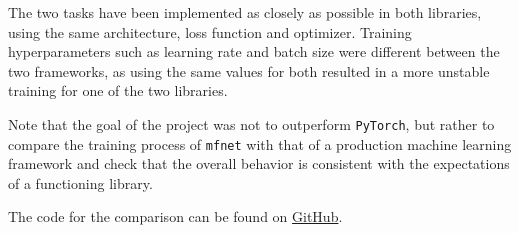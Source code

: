 \documentclass{unitothesis}
\newcommand{\mono}[1]{\texttt{#1}}
\newcommand{\mfnet}{\mono{mfnet}\xspace}
\newcommand{\pytorch}{\mono{PyTorch}\xspace}
\begin{document}
The two tasks have been implemented as closely as possible in both libraries, using the same architecture, loss function and optimizer. Training hyperparameters such as learning rate and batch size were different between the two frameworks, as using the same values for both resulted in a more unstable training for one of the two libraries.

Note that the goal of the project was not to outperform \pytorch, but rather to compare the training process of \mfnet with that of a production machine learning framework and check that the overall behavior is consistent with the expectations of a functioning library.

The code for the comparison can be found on \href{https://github.com/marchfra/interface}{GitHub}.





\appendix

\newpage

\end{document}
